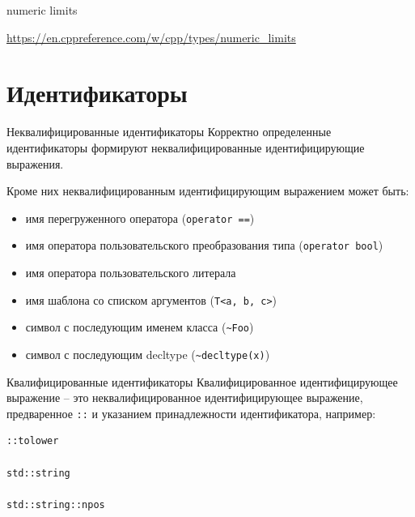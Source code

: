 \documentclass[unknownkeysallowed,xcolor=table]{beamer}
\newcommand{\textapprox}{\raisebox{0.5ex}{\texttildelow}}
\begin{document}
\begin{frame}{numeric limits}

\url{https://en.cppreference.com/w/cpp/types/numeric_limits}

\end{frame}


\section{Идентификаторы}

\begin{frame}[fragile]{Неквалифицированные идентификаторы}
Корректно определенные идентификаторы формируют неквалифицированные идентифицирующие выражения.

Кроме них неквалифицированным идентифицирующим выражением может быть:
\begin{itemize}
  \item имя перегруженного оператора (\lstinline[basicstyle=\ttfamily\small]{operator ==})
  \item имя оператора пользовательского преобразования типа (\lstinline[basicstyle=\ttfamily\small]{operator bool})
  \item имя оператора пользовательского литерала
  \item имя шаблона со списком аргументов (\lstinline[basicstyle=\ttfamily\small]{T<a, b, c>})
  \item символ \textapprox{} с последующим именем класса (\lstinline[basicstyle=\ttfamily\small]{~Foo})
  \item символ \textapprox{} с последующим decltype (\lstinline[basicstyle=\ttfamily\small]{~decltype(x)})
\end{itemize}

\end{frame}

\begin{frame}[fragile]{Квалифицированные идентификаторы}
Квалифицированное идентифицирующее выражение -- это неквалифицированное идентифицирующее выражение, предваренное \lstinline[basicstyle=\ttfamily\small]{::} и указанием принадлежности идентификатора, например: \vspace{1.5em}
\begin{lstlisting}[basicstyle=\ttfamily\small]
::tolower

std::string

std::string::npos
\end{lstlisting}

\end{frame}
\end{document}
